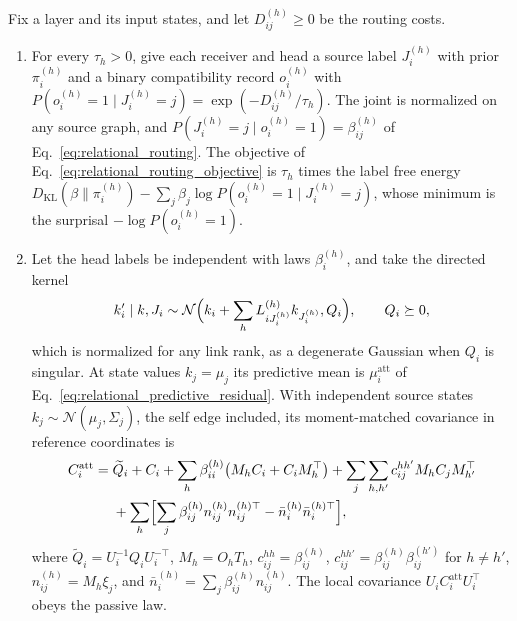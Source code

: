 \documentclass[twoside,11pt]{article}
\begin{document}
\begin{theorem}
\label{thm:probabilistic_status}
Fix a layer and its input states, and let $D_{ij}^{(h)}\ge0$ be the routing costs.
\begin{enumerate}
\item For every $\tau_h>0$, give each receiver and head a source label $J_i^{(h)}$ with prior $\pi_i^{(h)}$ and a binary compatibility record $o_i^{(h)}$ with $P(o_i^{(h)}=1\mid J_i^{(h)}=j)=\exp(-D_{ij}^{(h)}/\tau_h)$. The joint is normalized on any source graph, and $P(J_i^{(h)}=j\mid o_i^{(h)}=1)=\beta_{ij}^{(h)}$ of Eq.~\eqref{eq:relational_routing}. The objective of Eq.~\eqref{eq:relational_routing_objective} is $\tau_h$ times the label free energy $D_{\mathrm{KL}}(\beta\|\pi_i^{(h)})-\sum_j\beta_j\log P(o_i^{(h)}=1\mid J_i^{(h)}=j)$, whose minimum is the surprisal $-\log P(o_i^{(h)}=1)$.
\item Let the head labels be independent with laws $\beta_i^{(h)}$, and take the directed kernel
\begin{equation}
k_i'\mid k,J_i\sim\mathcal N\Bigl(k_i+\sum_hL_{iJ_i^{(h)}}^{(h)}k_{J_i^{(h)}},Q_i\Bigr),\qquad Q_i\succeq0,
\label{eq:predictive_kernel}
\end{equation}
which is normalized for any link rank, as a degenerate Gaussian when $Q_i$ is singular. At state values $k_j=\mu_j$ its predictive mean is $\mu_i^{\mathrm{att}}$ of Eq.~\eqref{eq:relational_predictive_residual}. With independent source states $k_j\sim\mathcal N(\mu_j,\Sigma_j)$, the self edge included, its moment-matched covariance in reference coordinates is
\begin{equation}
\begin{aligned}
C_i^{\mathrm{att}}={}&\widetilde Q_i+C_i+\sum_h\beta_{ii}^{(h)}\bigl(M_hC_i+C_iM_h^\top\bigr)
+\sum_j\sum_{h,h'}c_{ij}^{hh'}M_hC_jM_{h'}^\top\\
&+\sum_h\Bigl[\sum_j\beta_{ij}^{(h)}n_{ij}^{(h)}n_{ij}^{(h)\top}-\bar n_i^{(h)}\bar n_i^{(h)\top}\Bigr],
\end{aligned}
\label{eq:predictive_kernel_covariance}
\end{equation}
where $\widetilde Q_i=U_i^{-1}Q_iU_i^{-\top}$, $M_h=O_hT_h$, $c_{ij}^{hh}=\beta_{ij}^{(h)}$, $c_{ij}^{hh'}=\beta_{ij}^{(h)}\beta_{ij}^{(h')}$ for $h\ne h'$, $n_{ij}^{(h)}=M_h\xi_j$, and $\bar n_i^{(h)}=\sum_j\beta_{ij}^{(h)}n_{ij}^{(h)}$. The local covariance $U_iC_i^{\mathrm{att}}U_i^\top$ obeys the passive law.
\end{enumerate}
\end{theorem}
\end{document}
